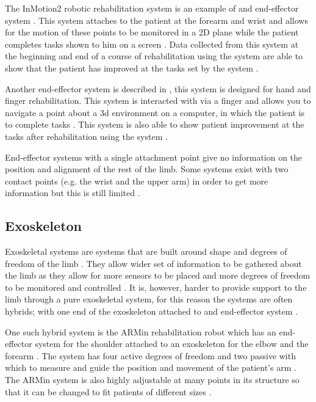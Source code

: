 \documentclass[journal]{IEEEtran}
\begin{document}
The InMotion2 robotic rehabilitation system is an example of and end-effector system \cite{QuantativeRobot}. 
This system attaches to the patient at the forearm and wrist and allows for the motion of these 
points to be monitored in a 2D plane while the patient completes tasks shown to him on 
a screen \cite{QuantativeRobot}. Data collected from this system at the beginning and end of a course of 
rehabilitation using the system are able to show that the patient has improved at the tasks 
set by the system \cite{QuantativeRobot}.

Another end-effector system is described in \cite{VRHandFingerr}, this system is designed for 
hand and finger rehabilitation. This system is interacted with via a finger and allows you to navigate 
a point about a 3d environment on a computer, in which the patient is to complete tasks \cite{VRHandFinger}.
This system is also able to show patient improvement at the tasks after rehabilitation using the 
system \cite{VRHandFinger}.

End-effector systems with a single attachment point give no information on the position and 
alignment of the rest of the limb. Some systems exist with two contact points (e.g. the wrist 
and the upper arm) in order to get more information but this is still limited \cite{AdvancesPush}.

\subsection{Exoskeleton}
Exoskeletal systems are systems that are built around shape and degrees of freedom of the limb \cite{AdvancesPush}. 
They allow wider set of information to be gathered about the limb as they allow for more sensors to be 
placed and more degrees of freedom to be monitored and controlled \cite{AdvancesPush}. It is, however, harder to 
provide support to the limb through a pure exoskeletal system, for this reason the systems are often 
hybrids; with one end of the exoskeleton attached to and end-effector system \cite{AdvancesPush}.

One such hybrid system is the ARMin rehabilitation robot which has an end-effector system for the 
shoulder attached to an exoskeleton for the elbow and the forearm \cite{ADLVE, ARMin}. The system has four active 
degrees of freedom and two passive with which to measure and guide the position and movement of 
the patient's arm \cite{ARMin}. The ARMin system is also highly adjustable at many points in its structure 
so that it can be changed to fit patients of different sizes \cite{ARMin}.
\end{document}
